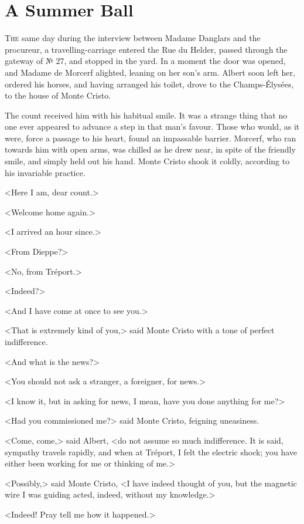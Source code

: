 \chapter{A Summer Ball} 

 \lettrine{T}{he} same day during the interview between Madame Danglars and the procureur, a travelling-carriage entered the Rue du Helder, passed through the gateway of № 27, and stopped in the yard. In a moment the door was opened, and Madame de Morcerf alighted, leaning on her son's arm. Albert soon left her, ordered his horses, and having arranged his toilet, drove to the Champs-Élysées, to the house of Monte Cristo. 

 The count received him with his habitual smile. It was a strange thing that no one ever appeared to advance a step in that man's favour. Those who would, as it were, force a passage to his heart, found an impassable barrier. Morcerf, who ran towards him with open arms, was chilled as he drew near, in spite of the friendly smile, and simply held out his hand. Monte Cristo shook it coldly, according to his invariable practice. 

 <Here I am, dear count.> 

 <Welcome home again.> 

 <I arrived an hour since.> 

 <From Dieppe?> 

 <No, from Tréport.> 

 <Indeed?> 

 <And I have come at once to see you.> 

 <That is extremely kind of you,> said Monte Cristo with a tone of perfect indifference. 

 <And what is the news?> 

 <You should not ask a stranger, a foreigner, for news.> 

 <I know it, but in asking for news, I mean, have you done anything for me?> 

 <Had you commissioned me?> said Monte Cristo, feigning uneasiness. 

 <Come, come,> said Albert, <do not assume so much indifference. It is said, sympathy travels rapidly, and when at Tréport, I felt the electric shock; you have either been working for me or thinking of me.> 

 <Possibly,> said Monte Cristo, <I have indeed thought of you, but the magnetic wire I was guiding acted, indeed, without my knowledge.>

<Indeed! Pray tell me how it happened.> 

